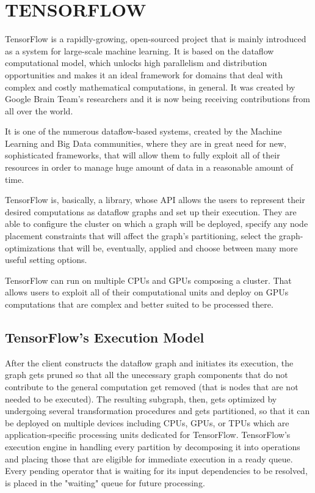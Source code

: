 \documentclass[ack,preface]{dithesis}
\begin{document}
\chapter{TENSORFLOW}

TensorFlow  \cite{Abadi:2016} is a rapidly-growing, open-sourced project that is mainly introduced as a system for large-scale machine learning. It is based on the dataflow computational model, which unlocks high parallelism and distribution opportunities and makes it an ideal framework for domains that deal with complex and costly mathematical computations, in general. It was created by Google Brain Team’s researchers and it is now being receiving contributions from all over the world. 

It is one of the numerous \cite{Zaharia:2012,Rossbach:2013, Theano, Jia2014caffe} dataflow-based systems, created by the Machine Learning and Big Data communities, where they are in great need for new, sophisticated frameworks, that will allow them to fully exploit all of their resources in order to manage huge amount of data in a reasonable amount of time.

TensorFlow is, basically, a library, whose API allows the users to represent their desired computations as dataflow graphs and set up their execution. 
They are able to configure the cluster on which a graph will be deployed, specify any node placement constraints that will affect the graph's partitioning, select the graph-optimizations that will be, eventually, applied and choose between many more useful setting options.

TensorFlow can run on multiple CPUs and GPUs composing a cluster. That allows users to exploit all of their computational units and deploy on GPUs computations that are complex and better suited to be processed there.

    \section{TensorFlow's Execution Model}

After the client constructs the dataflow graph and initiates its execution, the graph gets pruned so that all the unecessary graph components that do not contribute to the general computation get removed (that is nodes that are not needed to be executed). The resulting subgraph, then, gets optimized by undergoing several transformation procedures and gets partitioned, so that it can be deployed on multiple devices including CPUs, GPUs, or TPUs which are application-specific processing units dedicated for TensorFlow. TensorFlow's execution engine in handling every partition by decomposing it into operations and placing those that are eligible for immediate execution in a ready queue. Every pending operator that is waiting for its input dependencies to be resolved, is placed in the "waiting" queue for future processing.
\end{document}
